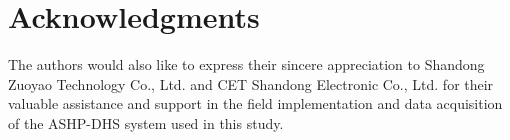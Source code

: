 \documentclass[journal]{IEEEtran}
\theoremstyle{remark}
\begin{document}
\section*{Acknowledgments}
The authors would also like to express their sincere appreciation to Shandong Zuoyao Technology Co., Ltd. and CET Shandong Electronic Co., Ltd. for their valuable assistance and support in the field implementation and data acquisition of the ASHP-DHS system used in this study.






\end{document}
